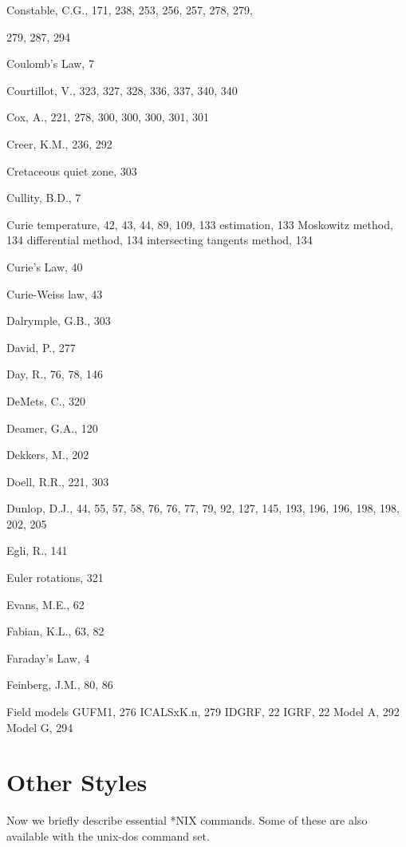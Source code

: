 \documentclass[draft,plain]{tauxe}
\begin{document}
\begin{theindex}
\item Constable, C.G., 171, 238, 253, 256, 257, 278, 279,
\item 279, 287, 294
\item Coulomb's Law, 7
\item Courtillot, V., 323, 327, 328, 336, 337, 340, 340
\item Cox, A., 221, 278, 300, 300, 300, 301, 301
\item Creer, K.M., 236, 292
\item Cretaceous quiet zone, 303
\item Cullity, B.D., 7
\item Curie temperature, 42, 43, 44, 89, 109, 133
\subitem estimation, 133
\subitem Moskowitz method, 134
\subitem differential method, 134
\subitem intersecting tangents method, 134
\item Curie's Law, 40
\item Curie-Weiss law, 43
\item Dalrymple, G.B., 303
\item David, P., 277
\item Day, R., 76, 78, 146
\item DeMets, C., 320
\item Deamer, G.A., 120
\item Dekkers, M., 202
\item Doell, R.R., 221, 303
\item Dunlop, D.J., 44, 55, 57, 58, 76, 76, 77, 79, 92, 127,
145, 193, 196, 196, 198, 198, 202, 205
\item Egli, R., 141
\item Euler rotations, 321
\item Evans, M.E., 62
\item Fabian, K.L., 63, 82
\item Faraday's Law, 4
\item Feinberg, J.M., 80, 86
\item Field models
\subitem GUFM1, 276
\subitem ICALSxK.n, 279
\subitem IDGRF, 22
\subitem IGRF, 22
\subitem Model A, 292
\subitem Model G, 294
\end{theindex}

\chapter*{Other Styles}

Now we briefly describe essential *NIX commands. Some of these are also available with the unix-dos command set.
\end{document}
